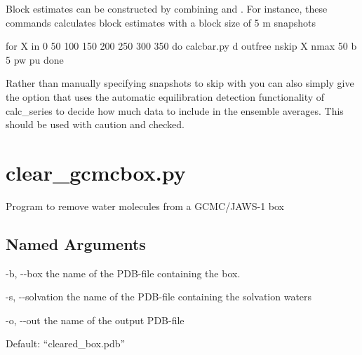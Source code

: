 \documentclass[letterpaper,10pt,english]{sphinxmanual}
\begin{document}
Block estimates can be constructed by combining  and . For instance, these commands calculates block estimates with a block size of 5 m snapshots

%
\begin{sphinxVerbatim}[commandchars=\\\{\}]
for X in 0 50 100 150 200 250 300 350
do
calc\PYGZus{}bar.py \PYGZhy{}d out\PYGZus{}free \PYGZhy{}nskip \PYGZdl{}X \PYGZhy{}nmax 50 \PYGZhy{}b 5 \PYGZhy{}pw \PYGZhy{}pu
done
\end{sphinxVerbatim}

Rather than manually specifying snapshots to skip with  you can also simply give the  option that uses the automatic equilibration detection functionality of calc\_series to decide how much data to include in the ensemble averages. This should be used with caution and checked.


\section{clear\_gcmcbox.py}
\label{\detokenize{tools:clear-gcmcbox-py}}

Program to remove water molecules from a GCMC/JAWS-1 box


%
\begin{sphinxVerbatim}[commandchars=\\\{\}]
  \PYG{p}{[}\PYG{p}{]} \PYG{p}{[} \PYG{p}{]} \PYG{p}{[} \PYG{p}{]} \PYG{p}{[} \PYG{p}{]}
\end{sphinxVerbatim}


\subsection{Named Arguments}
\label{\detokenize{tools:Named Arguments}}\begin{optionlist}{3cm}
\item [-b, -{-}box]  
the name of the PDB-file containing the box.
\item [-s, -{-}solvation]  
the name of the PDB-file containing the solvation waters
\item [-o, -{-}out]  
the name of the output PDB-file

Default: “cleared\_box.pdb”
\end{optionlist}
\end{document}
